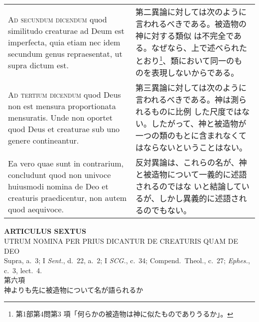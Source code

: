 \documentclass[paper=a4paper,fontsize=10pt,jafontsize=9pt,titlepage]{jlreq}
\begin{document}
\begin{longtable}{p{21em}p{21em}}
\\

{\scshape Ad secundum dicendum} quod similitudo creaturae ad Deum est
imperfecta, quia etiam nec idem secundum genus repraesentat, ut supra
dictum est.

&

第二異論に対しては次のように言われるべきである。被造物の神に対する類似
は不完全である。なぜなら、上で述べられたとおり\footnote{第1部第4問第3
項「何らかの被造物は神に似たものでありうるか」。}、類において同一のも
のを表現しないからである。

\\

{\scshape Ad tertium dicendum} quod Deus non est mensura proportionata
mensuratis. Unde non oportet quod Deus et creaturae sub uno genere
contineantur.

&

第三異論に対しては次のように言われるべきである。神は測られるものに比例
した尺度ではない。したがって、神と被造物が一つの類のもとに含まれなくて
はならないということはない。

\\

Ea vero quae sunt in contrarium, concludunt quod non univoce huiusmodi
nomina de Deo et creaturis praedicentur, non autem quod aequivoce.

&

反対異論は、これらの名が、神と被造物について一義的に述語されるのではな
いと結論しているが、しかし異義的に述語されるのでもない。

\end{longtable}

\newpage
{}

\begin{center}
{\Large {\bfseries ARTICULUS SEXTUS}}\\
{\large UTRUM NOMINA PER PRIUS DICANTUR DE CREATURIS QUAM DE DEO}\\
{\footnotesize Supra, a.~3; I {\itshape Sent.}, d.~22, a.~2; I
{\itshape SCG.}, c.~34; Compend.~Theol.}, c.~27; {\itshape Ephes.},
c.~3, lect.~4.\\
{\Large 第六項\\神よりも先に被造物について名が語られるか}
\end{center}
\end{document}
